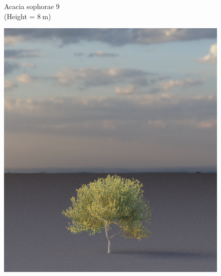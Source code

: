 \begin{figure}[t]
\begin{center}
        \begin{minipage}[c]{0.24\textwidth}
            \begin{flushleft}
                Acacia sophorae 9 \\
                (Height = $\SI{8}{\m}$)
            \end{flushleft}
        \end{minipage}
        \begin{minipage}[c]{0.24\textwidth}
            \includegraphics[valign=c, width=\linewidth]{img/OC41_9_mesh.png}
        \end{minipage}
        \begin{minipage}[c]{0.24\textwidth}

\end{minipage}
\end{center}
\end{figure}
